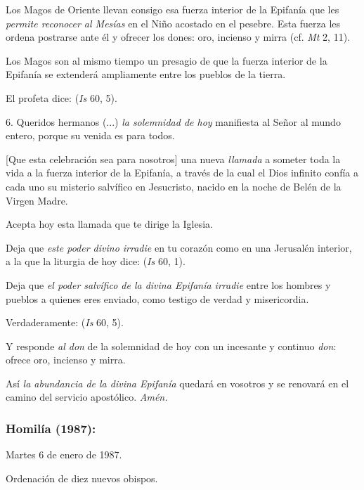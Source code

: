 \begin{body}
	Los Magos de Oriente llevan consigo esa fuerza interior de la Epifanía que les \emph{permite reconocer al Mesías} en el Niño acostado en el pesebre. Esta fuerza les ordena postrarse ante él y ofrecer los dones: oro, incienso y mirra (cf. \emph{Mt} 2, 11).
	
	Los Magos son al mismo tiempo un presagio de que la fuerza interior de la Epifanía se extenderá ampliamente entre los pueblos de la tierra.
	
	El profeta dice:  (\emph{Is} 60, 5).
	
	6. Queridos hermanos (...) \emph{la solemnidad de hoy} manifiesta al Señor al mundo entero, porque su venida es para todos.
	
	{[}Que esta celebración sea para nosotros{]} una nueva \emph{llamada} a someter toda la vida a la fuerza interior de la Epifanía, a través de la cual el Dios infinito confía a cada uno su misterio salvífico en Jesucristo, nacido en la noche de Belén de la Virgen Madre.
	
	Acepta hoy esta llamada que te dirige la Iglesia.
	
	Deja que \emph{este poder divino irradie} en tu corazón como en una Jerusalén interior, a la que la liturgia de hoy dice:  (\emph{Is} 60, 1).
	
	Deja que \emph{el poder salvífico de la divina Epifanía irradie} entre los hombres y pueblos a quienes eres enviado, como testigo de verdad y misericordia.
	
	Verdaderamente:  (\emph{Is} 60, 5).
	
	Y responde \emph{al don} de la solemnidad de hoy con un incesante y continuo \emph{don}: ofrece oro, incienso y mirra.
	
	Así \emph{la abundancia de la divina Epifanía} quedará en vosotros y se renovará en el camino del servicio apostólico. \emph{Amén.}
	
	\subsubsection{Homilía (1987): }
	
	Martes 6 de enero de 1987.
	
	Ordenación de diez nuevos obispos.
	

\end{body}
